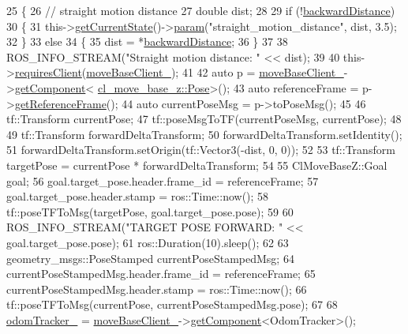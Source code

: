 \begin{DoxyCode}
25 \{
26     \textcolor{comment}{// straight motion distance}
27     \textcolor{keywordtype}{double} dist;
28 
29     \textcolor{keywordflow}{if} (!\hyperlink{classcl__move__base__z_1_1CbNavigateBackwards_abb7099e4e18602f6cf06c4f5534a2a15}{backwardDistance})
30     \{
31         this->\hyperlink{classsmacc_1_1SmaccClientBehavior_abf6773e4dd948f932f11a346dd6e7c2c}{getCurrentState}()->\hyperlink{classsmacc_1_1ISmaccState_a4982f2187ed6da337462721146e8ef70}{param}(\textcolor{stringliteral}{"straight\_motion\_distance"}, dist, 3.5);
32     \}
33     \textcolor{keywordflow}{else}
34     \{
35         dist = *\hyperlink{classcl__move__base__z_1_1CbNavigateBackwards_abb7099e4e18602f6cf06c4f5534a2a15}{backwardDistance};
36     \}
37 
38     ROS\_INFO\_STREAM(\textcolor{stringliteral}{"Straight motion distance: "} << dist);
39 
40     this->\hyperlink{classsmacc_1_1SmaccClientBehavior_a917f001e763a1059af337bf4e164f542}{requiresClient}(\hyperlink{classcl__move__base__z_1_1CbNavigateBackwards_a943c1a790eac9266adf11fbdc078f03a}{moveBaseClient\_});
41 
42     \textcolor{keyword}{auto} p = \hyperlink{classcl__move__base__z_1_1CbNavigateBackwards_a943c1a790eac9266adf11fbdc078f03a}{moveBaseClient\_}->\hyperlink{classsmacc_1_1ISmaccClient_adef78db601749ca63c19e74a27cb88cc}{getComponent}<
      \hyperlink{classcl__move__base__z_1_1Pose}{cl\_move\_base\_z::Pose}>();
43     \textcolor{keyword}{auto} referenceFrame = p->\hyperlink{classcl__move__base__z_1_1Pose_aaef18a35d7698fcbf6712149eead8e8d}{getReferenceFrame}();
44     \textcolor{keyword}{auto} currentPoseMsg = p->toPoseMsg();
45 
46     tf::Transform currentPose;
47     tf::poseMsgToTF(currentPoseMsg, currentPose);
48 
49     tf::Transform forwardDeltaTransform;
50     forwardDeltaTransform.setIdentity();
51     forwardDeltaTransform.setOrigin(tf::Vector3(-dist, 0, 0));
52 
53     tf::Transform targetPose = currentPose * forwardDeltaTransform;
54 
55     ClMoveBaseZ::Goal goal;
56     goal.target\_pose.header.frame\_id = referenceFrame;
57     goal.target\_pose.header.stamp = ros::Time::now();
58     tf::poseTFToMsg(targetPose, goal.target\_pose.pose);
59 
60     ROS\_INFO\_STREAM(\textcolor{stringliteral}{"TARGET POSE FORWARD: "} << goal.target\_pose.pose);
61     ros::Duration(10).sleep();
62 
63     geometry\_msgs::PoseStamped currentPoseStampedMsg;
64     currentPoseStampedMsg.header.frame\_id = referenceFrame;
65     currentPoseStampedMsg.header.stamp = ros::Time::now();
66     tf::poseTFToMsg(currentPose, currentPoseStampedMsg.pose);
67 
68     \hyperlink{classcl__move__base__z_1_1CbNavigateBackwards_a75a8ae7aef6c72e96f4037c4941b0341}{odomTracker\_} = \hyperlink{classcl__move__base__z_1_1CbNavigateBackwards_a943c1a790eac9266adf11fbdc078f03a}{moveBaseClient\_}->\hyperlink{classsmacc_1_1ISmaccClient_adef78db601749ca63c19e74a27cb88cc}{getComponent}<OdomTracker>();

\end{DoxyCode}
